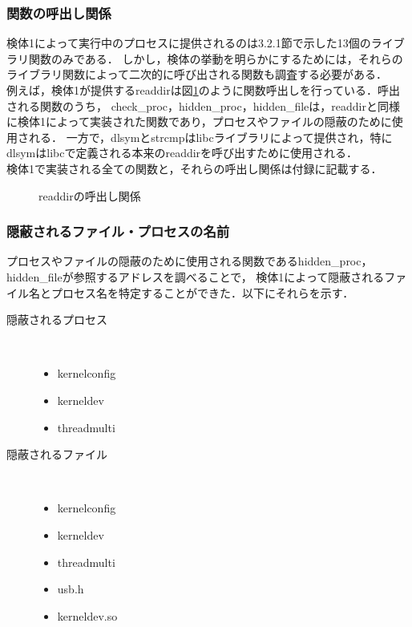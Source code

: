 \documentclass[submit,techreq,noauthor]{eco}	%
\begin{document}
\subsubsection{関数の呼出し関係}
検体1によって実行中のプロセスに提供されるのは3.2.1節で示した13個のライブラリ関数のみである．
しかし，検体の挙動を明らかにするためには，それらのライブラリ関数によって二次的に呼び出される関数も調査する必要がある．\\
\indent
例えば，検体1が提供するreaddirは図\ref{fig:call-graph}のように関数呼出しを行っている．呼出される関数のうち，
check\_proc，hidden\_proc，hidden\_fileは，readdirと同様に検体1によって実装された関数であり，プロセスやファイルの隠蔽のために使用される．
一方で，dlsymとstrcmpはlibcライブラリによって提供され，特にdlsymはlibcで定義される本来のreaddirを呼び出すために使用される．\\
\indent
検体1で実装される全ての関数と，それらの呼出し関係は付録に記載する．

\begin{figure}[H]
	\centering
	\caption{readdirの呼出し関係}
	\label{fig:call-graph}
\end{figure}

\subsubsection{隠蔽されるファイル・プロセスの名前}
プロセスやファイルの隠蔽のために使用される関数であるhidden\_proc，hidden\_fileが参照するアドレスを調べることで，
検体1によって隠蔽されるファイル名とプロセス名を特定することができた．以下にそれらを示す．
\begin{description}
  \item[隠蔽されるプロセス]　
  \begin{itemize}
    \item kernelconfig
    \item kerneldev
    \item threadmulti
  \end{itemize}
  \item[隠蔽されるファイル]　
  \begin{itemize}
    \item kernelconfig
    \item kerneldev
    \item threadmulti
    \item usb.h
    \item kerneldev.so 
  \end{itemize}
\end{description}
\end{document}
